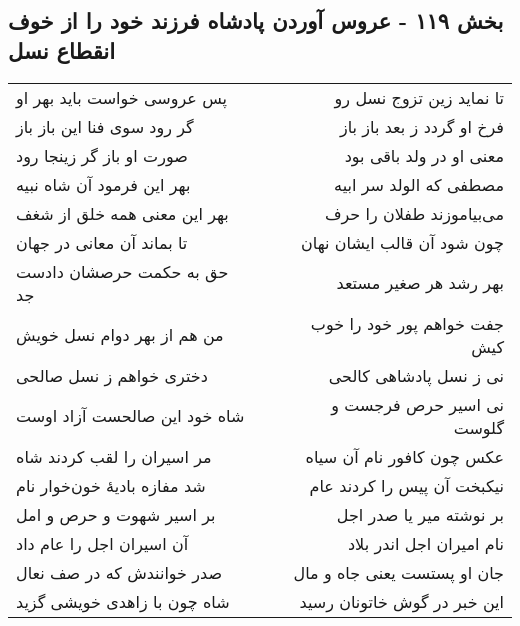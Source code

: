 \begin{center}
\section*{بخش ۱۱۹ - عروس آوردن پادشاه فرزند خود را از خوف انقطاع نسل}
\label{sec:sh119}
\begin{longtable}{l p{0.5cm} r}
پس عروسی خواست باید بهر او
&&
تا نماید زین تزوج نسل رو
\\
گر رود سوی فنا این باز باز
&&
فرخ او گردد ز بعد باز باز
\\
صورت او باز گر زینجا رود
&&
معنی او در ولد باقی بود
\\
بهر این فرمود آن شاه نبیه
&&
مصطفی که الولد سر ابیه
\\
بهر این معنی همه خلق از شغف
&&
می‌بیاموزند طفلان را حرف
\\
تا بماند آن معانی در جهان
&&
چون شود آن قالب ایشان نهان
\\
حق به حکمت حرصشان دادست جد
&&
بهر رشد هر صغیر مستعد
\\
من هم از بهر دوام نسل خویش
&&
جفت خواهم پور خود را خوب کیش
\\
دختری خواهم ز نسل صالحی
&&
نی ز نسل پادشاهی کالحی
\\
شاه خود این صالحست آزاد اوست
&&
نی اسیر حرص فرجست و گلوست
\\
مر اسیران را لقب کردند شاه
&&
عکس چون کافور نام آن سیاه
\\
شد مفازه بادیهٔ خون‌خوار نام
&&
نیکبخت آن پیس را کردند عام
\\
بر اسیر شهوت و حرص و امل
&&
بر نوشته میر یا صدر اجل
\\
آن اسیران اجل را عام داد
&&
نام امیران اجل اندر بلاد
\\
صدر خوانندش که در صف نعال
&&
جان او پستست یعنی جاه و مال
\\
شاه چون با زاهدی خویشی گزید
&&
این خبر در گوش خاتونان رسید
\\
\end{longtable}
\end{center}
